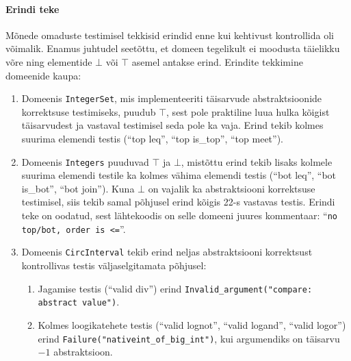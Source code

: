 \documentclass[../thesis.tex]{subfiles}
\begin{document}
\paragraph{Erindi teke}
Mõnede omaduste testimisel tekkisid erindid enne kui kehtivust kontrollida oli võimalik. Enamus juhtudel seetõttu, et domeen tegelikult ei moodusta täielikku võre ning elementide $\bot$ või $\top$ asemel antakse erind. Erindite tekkimine domeenide kaupa:
\begin{enumerate}
	\item Domeenis \texttt{IntegerSet}, mis implementeeriti täisarvude abstraktsioonide korrektsuse testimiseks, puudub $\top$, sest pole praktiline luua hulka kõigist täisarvudest ja vastaval testimisel seda pole ka vaja. Erind tekib kolmes suurima elemendi testis (\enquote{top leq}, \enquote{top is\_top}, \enquote{top meet}).

	\item Domeenis \texttt{Integers} puuduvad $\top$ ja $\bot$, mistõttu erind tekib lisaks kolmele suurima elemendi testile ka kolmes vähima elemendi testis (\enquote{bot leq}, \enquote{bot is\_bot}, \enquote{bot join}). Kuna $\bot$ on vajalik ka abstraktsiooni korrektsuse testimisel, siis tekib samal põhjusel erind kõigis 22-s vastavas testis. Erindi teke on oodatud, sest lähtekoodis on selle domeeni juures kommentaar: \enquote{\texttt{no top/bot, order is <=}}.

	\item Domeenis \texttt{CircInterval} tekib erind neljas abstraktsiooni korrektsust kontrollivas testis väljaselgitamata põhjusel:
	\begin{enumerate}[nosep]
		\item Jagamise testis (\enquote{valid div}) erind \texttt{Invalid\_argument("compare: abstract value")}.

		\item Kolmes loogikatehete testis (\enquote{valid lognot}, \enquote{valid logand}, \enquote{valid logor}) erind \texttt{Failure("nativeint\_of\_big\_int")}, kui argumendiks on täisarvu $-1$ abstraktsioon.
	\end{enumerate}
\end{enumerate}
\end{document}
